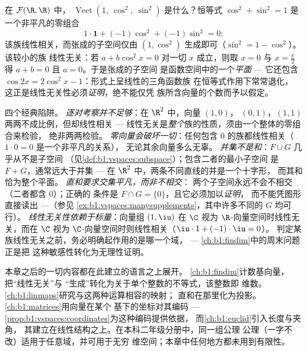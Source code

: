 \begin{example}[隐藏的关系使张成的子空间变小]
\label{ex:b1:vspaces:hiddenrelation}
在 $\mathcal{F}(\R, \R)$ 中，
$\operatorname{Vect}(1,\ \cos^2,\ \sin^2)$ 是什么？恒等式
$\cos^2 + \sin^2 = 1$ 是一个非平凡的零组合
\[
1\cdot\mathbf{1} + (-1)\cos^2 + (-1)\sin^2 = 0 :
\]
该族线性相关，而张成的子空间仅由
$(1, \cos^2)$ 生成即可（$\sin^2 = 1 - \cos^2$）。该较小的族
线性无关：若 $a + b\cos^2 x = 0$ 对一切 $x$ 成立，则取 $x = 0$ 与
$x = \frac\pi2$ 得 $a + b = 0$ 且 $a = 0$。于是张成的子空间
是函数空间中的一个\emph{平面} --- 它还包含
$\cos 2x = 2\cos^2 x - 1$：形式上呈线性的三角函数族
在恒等式作用下常常退化，
这正是线性无关性必须\emph{证明}，绝不能仅凭
族所含向量的个数而予以假定。
\end{example}

\begin{remark}[常见陷阱]
\label{rem:b1:vspaces:pitfalls}
四个经典陷阱。
\emph{逐对考察并不足够}：在 $\R^2$ 中，向量 $(1,0)$，
$(0,1)$，$(1,1)$ 两两不成比例，但却线性相关 ---
线性无关是\emph{整个}族的性质，须由一个整体的零组合来检验，
绝非两两检验。
\emph{零向量会破坏一切}：任何包含
$0$ 的族都线性相关（$1\cdot 0 = 0$ 是一个非平凡的关系），
无论其余向量多么无辜。
\emph{并集不是和}：$F \cup G$ 几乎从不是子空间
（见\cref{def:b1:vspaces:subspace}）；包含二者的最小子空间
是 $F + G$，通常远大于并集 ---
在 $\R^2$ 中，两条不同直线的并是一个十字形，
而其和恰为整个平面。
\emph{直和要求交集平凡，而非不相交}：
两个子空间永远不会不相交（二者都含 $0$）；正确的
条件是 $F \cap G = \{0\}$，且它必须加以\emph{证明}，
而不能凭图形直接读出 ---（参见
\cref{ex:b1:vspaces:manysupplements}，其中许多不同的 $G$
均可行）。
\emph{线性无关性依赖于标量}：向量组 $(1, \iu)$
在 $\C$ 视为 $\R$-向量空间时线性无关，而在 $\C$
视为 $\C$-向量空间时则线性相关（$\iu\cdot 1 + (-1)\cdot\iu = 0$）。
判定某族线性无关之前，务必明确起作用的是哪一个域，
--- \cref{ch:b1:findim}中的周末问题正是把
这种敏感性转化为无理性证明。
\end{remark}

\begin{remark}[这套语言的后续应用]
\label{rem:b1:vspaces:whereused}
本章之后的一切内容都在此建立的语言之上展开。
\cref{ch:b1:findim}计数基向量，把“线性无关”与
“生成”转化为关于单个整数的不等式，该整数即
维数。\cref{ch:b1:linmaps}研究与这两种运算相容的映射；
直和在那里化为投影。
\cref{ch:b1:matrices}用向量在某个
基下的坐标对其编码 --- \cref{prop:b1:vspaces:coordinates}为这种编码提供依据，
而\cref{ch:b1:euclid}引入长度与夹角，
其建立在线性结构之上。在本科二年级分册中，同一组公理
公理（一字不改）适用于任意域，并可用于无穷
维空间；本章中任何地方都未用到有限性。
\end{remark}

